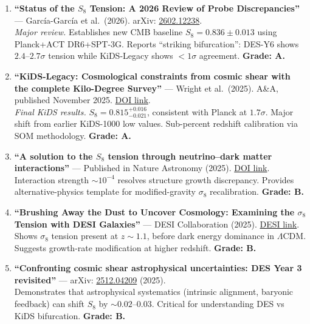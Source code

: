 \documentclass[11pt,a4paper]{article}
\begin{document}
\begin{enumerate}
\item \textbf{``Status of the $S_8$ Tension: A 2026 Review of Probe Discrepancies''} --- Garc\'{i}a-Garc\'{i}a et al.\ (2026). arXiv: \href{https://arxiv.org/abs/2602.12238}{2602.12238}.\\
\textit{Major review.} Establishes new CMB baseline $S_8 = 0.836 \pm 0.013$ using Planck+ACT DR6+SPT-3G. Reports ``striking bifurcation'': DES-Y6 shows $2.4$--$2.7\sigma$ tension while KiDS-Legacy shows $<1\sigma$ agreement. \textbf{Grade: A.}

\item \textbf{``KiDS-Legacy: Cosmological constraints from cosmic shear with the complete Kilo-Degree Survey''} --- Wright et al.\ (2025). A\&A, published November 2025. \href{https://www.aanda.org/articles/aa/full_html/2025/11/aa54908-25/aa54908-25.html}{DOI link}.\\
\textit{Final KiDS results.} $S_8 = 0.815^{+0.016}_{-0.021}$, consistent with Planck at $1.7\sigma$. Major shift from earlier KiDS-1000 low values. Sub-percent redshift calibration via SOM methodology. \textbf{Grade: A.}

\item \textbf{``A solution to the $S_8$ tension through neutrino--dark matter interactions''} --- Published in Nature Astronomy (2025). \href{https://www.nature.com/articles/s41550-025-02733-1}{DOI link}.\\
Interaction strength $\sim 10^{-4}$ resolves structure growth discrepancy. Provides alternative-physics template for modified-gravity $\sigma_8$ recalibration. \textbf{Grade: B.}

\item \textbf{``Brushing Away the Dust to Uncover Cosmology: Examining the $\sigma_8$ Tension with DESI Galaxies''} --- DESI Collaboration (2025). \href{https://www.desi.lbl.gov/2025/01/12/brushing-away-dust-to-uncover-cosmology-examining-the-sigma-8-tension-with-desi-galaxies/}{DESI link}.\\
Shows $\sigma_8$ tension present at $z \sim 1.1$, before dark energy dominance in $\Lambda$CDM. Suggests growth-rate modification at higher redshift. \textbf{Grade: B.}

\item \textbf{``Confronting cosmic shear astrophysical uncertainties: DES Year 3 revisited''} --- arXiv: \href{https://arxiv.org/abs/2512.04209}{2512.04209} (2025).\\
Demonstrates that astrophysical systematics (intrinsic alignment, baryonic feedback) can shift $S_8$ by $\sim 0.02$--$0.03$. Critical for understanding DES vs KiDS bifurcation. \textbf{Grade: B.}
\end{enumerate}
\end{document}
